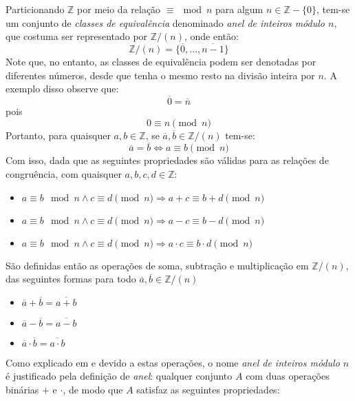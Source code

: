 Particionando $\mathbb{Z}$ por meio da relação $\equiv \mod n$ para algum $n \in \mathbb{Z} - \{0\}$, tem-se um conjunto de \textit{classes de equivalência} denominado \textit{anel de inteiros módulo $n$}, que costuma ser representado por $\mathbb{Z}/(n)$, onde então:
\begin{equation*}
    \mathbb{Z}/(n) = \{\overline{0}, ..., \overline{n - 1}\}
\end{equation*}
Note que, no entanto, as classes de equivalência podem ser denotadas por diferentes números, desde que tenha o mesmo resto na divisão inteira por $n$. A exemplo disso observe que:
\begin{equation*}
    \overline{0} = \overline{n}
\end{equation*}
pois
\begin{equation}
    0 \equiv n \pmod{n}
\end{equation}
Portanto, para quaisquer $a, b \in \mathbb{Z}$, se $\overline{a}, \overline{b} \in \mathbb{Z}/(n)$ tem-se:
\begin{equation*}
    \overline{a} = \overline{b} \Longleftrightarrow a \equiv b \pmod{n}
\end{equation*}
Com isso, dada que as seguintes propriedades são válidas para as relações de congruência, com quaisquer $a, b, c, d \in \mathbb{Z}$:
\begin{itemize}
    \item $a \equiv b \mod n \land c \equiv d \pmod{n} \Rightarrow a + c \equiv b + d \pmod{n}$
    \item $a \equiv b \mod n \land c \equiv d \pmod{n} \Rightarrow a - c \equiv b - d \pmod{n}$
    \item $a \equiv b \mod n \land c \equiv d \pmod{n} \Rightarrow a \cdot c \equiv b \cdot d \pmod{n}$
\end{itemize}
São definidas então as operações de soma, subtração e multiplicação em $\mathbb{Z}/(n)$, das seguintes formas para todo $\overline{a}, \overline{b} \in \mathbb{Z}/(n)$
\begin{itemize}
    \item $\overline{a} + \overline{b} = \overline{a + b}$
    \item $\overline{a} - \overline{b} = \overline{a - b}$
    \item $\overline{a} \cdot \overline{b} = \overline{a \cdot b}$
\end{itemize}
Como explicado em \cite[p.~46-47]{book:2399854} e devido a estas operações, o nome \textit{anel de inteiros módulo $n$} é justificado pela definição de \textit{anel}: qualquer conjunto $A$ com duas operações binárias $+$ e $\cdot$, de modo que $A$ satisfaz as seguintes propriedades:

